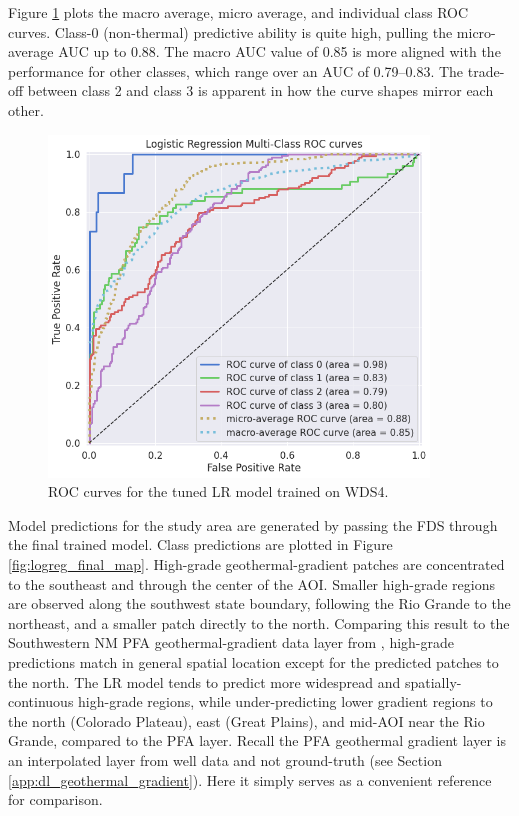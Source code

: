Figure \ref{fig:logreg_auc} plots the macro average, micro average, and individual class ROC curves. Class-0 (non-thermal) predictive ability is quite high, pulling the micro-average AUC up to 0.88.  The macro AUC value of 0.85 is more aligned with the performance for other classes, which range over an AUC of 0.79--0.83. The trade-off between class 2 and class 3 is apparent in how the curve shapes mirror each other.

\begin{figure}[!htp]
\centering
\includegraphics[width=0.9\textwidth]{templates/images/Figure-LR-AUC.png}
\singlespacing
\caption[Logistic regression ROC curves]{ROC curves for the tuned LR model trained on WDS4.}
\label{fig:logreg_auc}
\end{figure}

Model predictions for the study area are generated by passing the FDS through the final trained model. Class predictions are plotted in Figure \ref{fig:logreg_final_map}. High-grade geothermal-gradient patches are concentrated to the southeast and through the center of the AOI. Smaller high-grade regions are observed along the southwest state boundary, following the Rio Grande to the northeast, and a smaller patch directly to the north. Comparing this result to the Southwestern NM PFA geothermal-gradient data layer from \citet{bielicki_hydrogeolgic_2015}, high-grade predictions match in general spatial location except for the predicted patches to the north. The LR model tends to predict more widespread and spatially-continuous high-grade regions, while under-predicting lower gradient regions to the north (Colorado Plateau), east (Great Plains), and mid-AOI near the Rio Grande, compared to the PFA layer. Recall the PFA geothermal gradient layer is an interpolated layer from well data and not ground-truth (see Section \ref{app:dl_geothermal_gradient}). Here it simply serves as a convenient reference for comparison.

